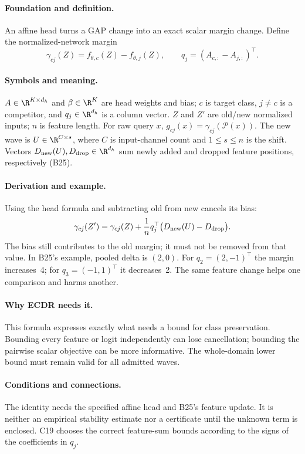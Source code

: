 \paragraph{Foundation and definition.}
An affine head turns a GAP change into an exact scalar margin change.
Define the normalized-network margin
\[
 \gamma_{cj}(Z)=f_{\theta,c}(Z)-f_{\theta,j}(Z),\qquad
 q_j=(A_{c,:}-A_{j,:})^\top.
\]
\paragraph{Symbols and meaning.}
$A\in\R^{K\times d_h}$ and $\beta\in\R^K$ are head weights and bias;
$c$ is target class, $j\ne c$ is a competitor, and $q_j\in\R^{d_h}$
is a column vector. $Z$ and $Z'$ are old/new normalized inputs;
$n$ is feature length. For raw query $x$, $g_{cj}(x)=\gamma_{cj}(\mathcal P(x))$.
The new wave is $U\in\R^{C\times s}$, where $C$ is input-channel count and
$1\le s\le n$ is the shift. Vectors $D_{\rm new}(U),D_{\rm drop}\in\R^{d_h}$
sum newly added and dropped feature positions, respectively (B25).
\paragraph{Derivation and example.}
Using the head formula and subtracting old from new cancels its bias:
\[
 \gamma_{cj}(Z')=\gamma_{cj}(Z)+
 \frac1nq_j^\top\big(D_{\rm new}(U)-D_{\rm drop}\big).
\]
The bias still contributes to the old margin; it must not be removed
from that value. In B25's example, pooled delta is $(2,0)$.
For $q_2=(2,-1)^\top$ the margin increases~4; for
$q_3=(-1,1)^\top$ it decreases~2. The same feature change helps one
comparison and harms another.
\paragraph{Why ECDR needs it.}
This formula expresses exactly what needs a bound for class preservation.
Bounding every feature or logit independently can lose cancellation;
bounding the pairwise scalar objective can be more informative. The
whole-domain lower bound must remain valid for all admitted waves.
\paragraph{Conditions and connections.}
The identity needs the specified affine head and B25's feature update.
It is neither an empirical stability estimate nor a certificate until
the unknown term is enclosed. C19 chooses the correct feature-sum bounds
according to the signs of the coefficients in $q_j$.

